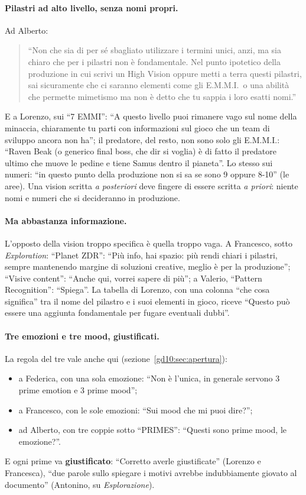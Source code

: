 \paragraph{Pilastri ad alto livello, senza nomi propri.} Ad Alberto:
\begin{quote}
  ``Non che sia di per sé sbagliato utilizzare i termini unici, anzi, ma sia
  chiaro che per i pilastri non è fondamentale. Nel punto ipotetico della
  produzione in cui scrivi un High Vision oppure metti a terra questi
  pilastri, sai sicuramente che ci saranno elementi come gli E.M.M.I.\ o una
  abilità che permette mimetismo ma non è detto che tu sappia i loro esatti
  nomi.''
\end{quote}
E a Lorenzo, sui ``7 EMMI'': ``A questo livello puoi rimanere vago sul nome
della minaccia, chiaramente tu parti con informazioni sul gioco che un team di
sviluppo ancora non ha''; il predatore, del resto, non sono solo gli E.M.M.I.:
``Raven Beak (o generico final boss, che dir si voglia) è di fatto il
predatore ultimo che muove le pedine e tiene Samus dentro il pianeta''. Lo
stesso sui numeri: ``in questo punto della produzione non si sa se sono 9
oppure 8-10'' (le aree). Una vision scritta \emph{a posteriori} deve fingere
di essere scritta \emph{a priori}: niente nomi e numeri che si decideranno in
produzione.

\paragraph{Ma abbastanza informazione.} L'opposto della vision troppo
specifica è quella troppo vaga. A Francesco, sotto \emph{Exploration}:
``Planet ZDR'': ``Più info, hai spazio: più rendi chiari i pilastri, sempre
mantenendo margine di soluzioni creative, meglio è per la produzione'';
``Visive content'': ``Anche qui, vorrei sapere di più''; a Valerio,
``Pattern Recognition'': ``Spiega''. La tabella di Lorenzo, con una colonna
``che cosa significa'' tra il nome del pilastro e i suoi elementi in gioco,
riceve ``Questo può essere una aggiunta fondamentale per fugare eventuali
dubbi''.

\paragraph{Tre emozioni e tre mood, giustificati.} La regola del tre vale
anche qui (sezione~\ref{gd10:sec:apertura}):
\begin{itemize}
  \item a Federica, con una sola emozione: ``Non è l'unica, in generale
        servono 3 prime emotion e 3 prime mood'';
  \item a Francesco, con le sole emozioni: ``Sui mood che mi puoi dire?'';
  \item ad Alberto, con tre coppie sotto ``PRIMES'': ``Questi sono prime
        mood, le emozione?''.
\end{itemize}
E ogni prime va \textbf{giustificato}: ``Corretto averle giustificate''
(Lorenzo e Francesca), ``due parole sullo spiegare i motivi avrebbe
indubbiamente giovato al documento'' (Antonino, su \emph{Esplorazione}).

